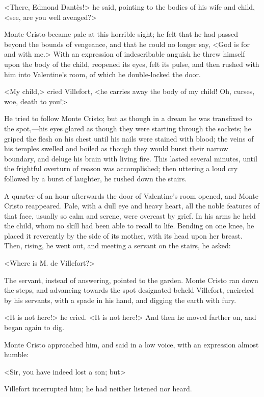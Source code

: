  <There, Edmond Dantès!> he said, pointing to the bodies of his wife and child, <see, are you well avenged?> 

 Monte Cristo became pale at this horrible sight; he felt that he had passed beyond the bounds of vengeance, and that he could no longer say, <God is for and with me.> With an expression of indescribable anguish he threw himself upon the body of the child, reopened its eyes, felt its pulse, and then rushed with him into Valentine's room, of which he double-locked the door. 

 <My child,> cried Villefort, <he carries away the body of my child! Oh, curses, woe, death to you!> 

 He tried to follow Monte Cristo; but as though in a dream he was transfixed to the spot,—his eyes glared as though they were starting through the sockets; he griped the flesh on his chest until his nails were stained with blood; the veins of his temples swelled and boiled as though they would burst their narrow boundary, and deluge his brain with living fire. This lasted several minutes, until the frightful overturn of reason was accomplished; then uttering a loud cry followed by a burst of laughter, he rushed down the stairs. 

 A quarter of an hour afterwards the door of Valentine's room opened, and Monte Cristo reappeared. Pale, with a dull eye and heavy heart, all the noble features of that face, usually so calm and serene, were overcast by grief. In his arms he held the child, whom no skill had been able to recall to life. Bending on one knee, he placed it reverently by the side of its mother, with its head upon her breast. Then, rising, he went out, and meeting a servant on the stairs, he asked: 

 <Where is M. de Villefort?> 

 The servant, instead of answering, pointed to the garden. Monte Cristo ran down the steps, and advancing towards the spot designated beheld Villefort, encircled by his servants, with a spade in his hand, and digging the earth with fury. 

 <It is not here!> he cried. <It is not here!>  And then he moved farther on, and began again to dig. 

 Monte Cristo approached him, and said in a low voice, with an expression almost humble: 

 <Sir, you have indeed lost a son; but\longdash> 

 Villefort interrupted him; he had neither listened nor heard. 

